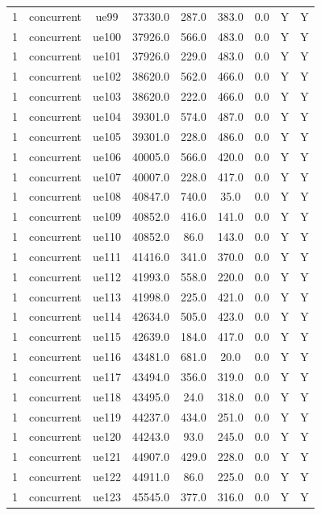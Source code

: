 \begin{table}[ht]
\begin{tabular}{|c|c|c|c|c|c|c|c|c|}
1 & concurrent & ue99 & 37330.0 & 287.0 & 383.0 & 0.0 & Y & Y \\
1 & concurrent & ue100 & 37926.0 & 566.0 & 483.0 & 0.0 & Y & Y \\
1 & concurrent & ue101 & 37926.0 & 229.0 & 483.0 & 0.0 & Y & Y \\
1 & concurrent & ue102 & 38620.0 & 562.0 & 466.0 & 0.0 & Y & Y \\
1 & concurrent & ue103 & 38620.0 & 222.0 & 466.0 & 0.0 & Y & Y \\
1 & concurrent & ue104 & 39301.0 & 574.0 & 487.0 & 0.0 & Y & Y \\
1 & concurrent & ue105 & 39301.0 & 228.0 & 486.0 & 0.0 & Y & Y \\
1 & concurrent & ue106 & 40005.0 & 566.0 & 420.0 & 0.0 & Y & Y \\
1 & concurrent & ue107 & 40007.0 & 228.0 & 417.0 & 0.0 & Y & Y \\
1 & concurrent & ue108 & 40847.0 & 740.0 & 35.0 & 0.0 & Y & Y \\
1 & concurrent & ue109 & 40852.0 & 416.0 & 141.0 & 0.0 & Y & Y \\
1 & concurrent & ue110 & 40852.0 & 86.0 & 143.0 & 0.0 & Y & Y \\
1 & concurrent & ue111 & 41416.0 & 341.0 & 370.0 & 0.0 & Y & Y \\
1 & concurrent & ue112 & 41993.0 & 558.0 & 220.0 & 0.0 & Y & Y \\
1 & concurrent & ue113 & 41998.0 & 225.0 & 421.0 & 0.0 & Y & Y \\
1 & concurrent & ue114 & 42634.0 & 505.0 & 423.0 & 0.0 & Y & Y \\
1 & concurrent & ue115 & 42639.0 & 184.0 & 417.0 & 0.0 & Y & Y \\
1 & concurrent & ue116 & 43481.0 & 681.0 & 20.0 & 0.0 & Y & Y \\
1 & concurrent & ue117 & 43494.0 & 356.0 & 319.0 & 0.0 & Y & Y \\
1 & concurrent & ue118 & 43495.0 & 24.0 & 318.0 & 0.0 & Y & Y \\
1 & concurrent & ue119 & 44237.0 & 434.0 & 251.0 & 0.0 & Y & Y \\
1 & concurrent & ue120 & 44243.0 & 93.0 & 245.0 & 0.0 & Y & Y \\
1 & concurrent & ue121 & 44907.0 & 429.0 & 228.0 & 0.0 & Y & Y \\
1 & concurrent & ue122 & 44911.0 & 86.0 & 225.0 & 0.0 & Y & Y \\
1 & concurrent & ue123 & 45545.0 & 377.0 & 316.0 & 0.0 & Y & Y \\

\end{tabular}
\end{table}
